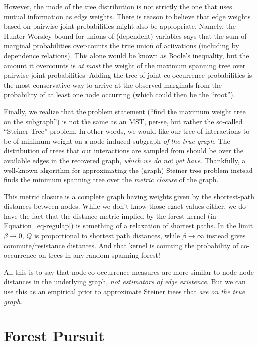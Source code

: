 \documentclass[%
	12pt,
		oneside,
		letterpaper
]{book}
\begin{document}
However, the mode of the tree distribution is not strictly the one that
uses mutual information as edge weights. There is reason to believe that
edge weights based on pairwise joint probabilities might also be
appropriate. Namely, the Hunter-Worsley bound for unions of (dependent)
variables says that the sum of marginal probabilities over-counts the
true union of activations (including by dependence relations). This
alone would be known as Boole's inequality, but the amount it overcounts
is \emph{at most} the weight of the maximum spanning tree over pairwise
joint probabilities.\autocite{upperboundprobability_Hunter1976} Adding
the tree of joint co-occurrence probabilities is the most conservative
way to arrive at the observed marginals from the probability of at least
one node occurring (which could then be the ``root'').

Finally, we realize that the problem statement (``find the maximum
weight tree on the subgraph'') is not the same as an MST, per-se, but
rather the so-called ``Steiner Tree'' problem. In other words, we would
like our tree of interactions to be of minimum weight on a node-induced
subgraph \emph{of the true graph}. The distribution of trees that our
interactions are sampled from should be over the available edges in the
recovered graph, \emph{which we do not yet have}. Thankfully, a
well-known algorithm for approximating the (graph) Steiner tree problem
instead finds the minimum spanning tree over the \emph{metric closure}
of the graph.\autocite{fastalgorithmSteiner_Kou1981}

This metric closure is a complete graph having weights given by the
shortest-path distances between nodes. While we don't know those exact
values either, we do have the fact that the distance metric implied by
the forest kernel (in Equation~\ref{eq-regulap}) is something of a
relaxation of shortest paths. In the limit \(\beta\rightarrow 0\), \(Q\)
is proportional to shortest path distances, while
\(\beta\rightarrow\infty\) instead gives commute/resistance
distances.\autocite{Semisupervisedlearning_Avrachenkov2017} And that
kernel is counting the probability of co-occurrence on trees in any
random spanning forest!

All this is to say that node co-occurrence measures are more similar to
node-node distances in the underlying graph, \emph{not estimators of
edge existence}. But we can use this as an empirical prior to
approximate Steiner trees that \emph{are on the true graph}.

\section{Forest Pursuit}\label{sec-FP}
\end{document}
